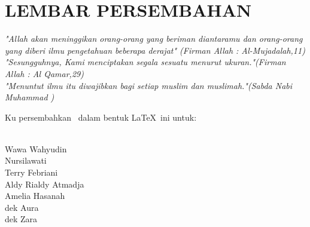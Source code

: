 \chapter*{LEMBAR PERSEMBAHAN} 
\vspace{0.5cm}

\begin{center}
\textit{"Allah akan meninggikan orang-orang yang beriman diantaramu dan orang-orang yang diberi ilmu pengetahuan beberapa derajat" (Firman Allah : Al-Mujadalah,11)}
\vspace{0.7cm}
\\
\textit{"Sesungguhnya, Kami menciptakan segala sesuatu menurut ukuran."(Firman Allah : Al Qamar,29)}
\vspace{0.7cm}
\\
\textit{"Menuntut ilmu itu diwajibkan bagi setiap muslim dan muslimah."(Sabda Nabi Muhammad )}
\vspace{0.7cm}
\\

\end{center}

\begin{flushright}
\vspace{1.5cm}
Ku persembahkan \model\ dalam bentuk \LaTeX\ ini untuk:
\begin{footnotesize}
\\Wawa Wahyudin 
\\Nursilawati
\\Terry Febriani
\\Aldy Rialdy Atmadja
\\Amelia Hasanah 
\\dek Aura
\\dek Zara
\end{footnotesize}
\end{flushright}

